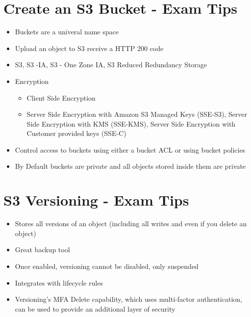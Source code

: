 \documentclass{report}
\begin{document}
\section*{Create an S3 Bucket - Exam Tips}
\begin{itemize}
\item
Buckets are a univeral name space

\item
Upload an object to S3 receive a HTTP 200 code

\item
S3, S3 -IA, S3 - One Zone IA, S3 Reduced Redundancy Storage

\item
Encryption
	\begin{itemize}
	\item
	Client Side Encryption
	
	\item
	Server Side Encryption with Amazon S3 Managed Keys (SSE-S3), Server Side Encryption with KMS (SSE-KMS), Server Side Encryption with Customer provided keys (SSE-C)
	\end{itemize}

\item
Control access to buckets using either a bucket ACL or using bucket policies

\item
By Default buckets are private and all objects stored inside them are private

\end{itemize}

\section*{S3 Versioning - Exam Tips}
\begin{itemize}
\item
Stores all versions of an object (including all writes and even if you delete an object)

\item
Great backup tool

\item
Once enabled, versioning cannot be disabled, only suspended

\item
Integrates with lifecycle rules

\item
Versioning's MFA Delete capability, which uses multi-factor authentication, can be used to provide an additional layer of security
\end{itemize}
\end{document}
